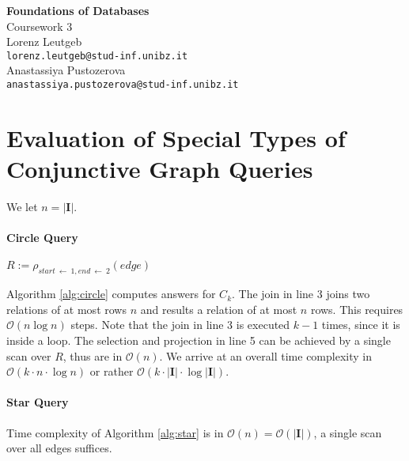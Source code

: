 \documentclass[a4paper,12pt]{article}
\newcommand{\dbi}{\ensuremath{\mathbf{I}}}
\newcommand{\bigo}{\ensuremath{\mathcal{O}}}
\begin{document}
\begin{center}
{\LARGE\bfseries Foundations of Databases}\\[3mm]

{\Large Coursework 3}\\[5mm]

Lorenz Leutgeb\\\texttt{lorenz.leutgeb@stud-inf.unibz.it}\\[2mm]
Anastassiya Pustozerova\\\texttt{anastassiya.pustozerova@stud-inf.unibz.it}
\end{center}

\section{Evaluation of Special Types of Conjunctive Graph Queries}

We let $n = |\dbi|$.

\paragraph{Circle Query}{
\begin{algorithm}
	$R := \rho_{start \: \leftarrow\: 1, end\: \leftarrow\: 2}(edge)$\\
	\caption{$\mathsf{EvalCircle}(k)$}
	\label{alg:circle}
\end{algorithm}

Algorithm \ref{alg:circle} computes answers for $C_k$. The join in line 3 joins two relations of at most rows $n$ and results a relation of at most $n$ rows. This requires $\bigo(n \log n)$ steps. Note that the join in line 3 is executed $k - 1$ times, since it is inside a loop. The selection and projection in line 5 can be achieved by a single scan over $R$, thus are in $\bigo(n)$. We arrive at an overall time complexity in $\bigo(k \cdot n \cdot \log n)$ or rather $\bigo(k \cdot |\dbi| \cdot \log |\dbi|)$.
}

\paragraph{Star Query}{

\begin{algorithm}
\caption{$\mathsf{EvalStar}(k, \dbi, \bar{c})$}
\label{alg:star}
\end{algorithm}

Time complexity of Algorithm \ref{alg:star} is in $\bigo(n) = \bigo(|\dbi|)$, a single scan over all edges suffices.
}
\end{document}
